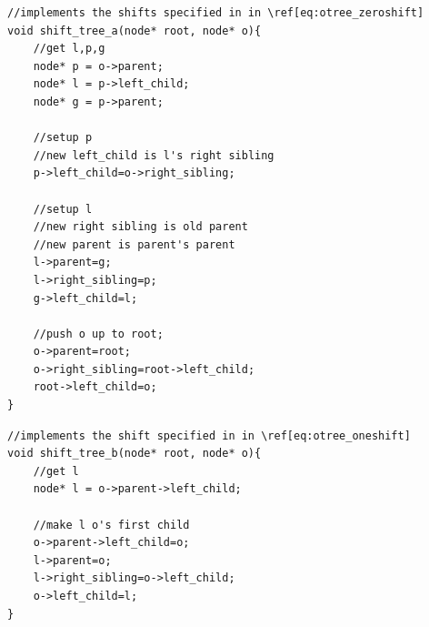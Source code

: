 \begin{Verbatim}[commandchars=\\\[\]] 
//implements the shifts specified in in \ref[eq:otree_zeroshift]
void shift_tree_a(node* root, node* o){ 
    //get l,p,g
    node* p = o->parent;
    node* l = p->left_child;
    node* g = p->parent;

    //setup p
    //new left_child is l's right sibling
    p->left_child=o->right_sibling;

    //setup l
    //new right sibling is old parent
    //new parent is parent's parent
    l->parent=g;
    l->right_sibling=p;
    g->left_child=l;

    //push o up to root;
    o->parent=root;
    o->right_sibling=root->left_child;
    root->left_child=o;
}
\end{Verbatim}



\begin{Verbatim}[commandchars=\\\[\]]
//implements the shift specified in in \ref[eq:otree_oneshift]
void shift_tree_b(node* root, node* o){
    //get l
    node* l = o->parent->left_child;
                                                                            
    //make l o's first child
    o->parent->left_child=o;
    l->parent=o;
    l->right_sibling=o->left_child;
    o->left_child=l;
}
\end{Verbatim}

